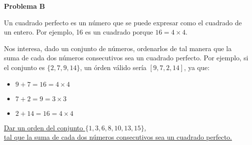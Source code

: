 \begin{center}
\Large \textbf{Problema B} \\
\end{center}

Un cuadrado perfecto es un número que se puede expresar como el cuadrado de un entero. Por ejemplo, 16 es un cuadrado porque $16 = 4 \times 4$.

\bigskip
Nos interesa, dado un conjunto de números, ordenarlos de tal manera que la suma de cada dos números consecutivos sea un cuadrado perfecto.
Por ejemplo, si el conjunto es $\{2, 7, 9, 14\}$, un órden válido sería $[9, 7, 2, 14]$, ya que:
\begin{itemize}
    \item $9 + 7 = 16 = 4 \times 4$
    \item $7 + 2 = 9 = 3 \times 3$
    \item $2 + 14 = 16 = 4 \times 4$
\end{itemize}

\underline{Dar un orden del conjunto $\{1, 3, 6, 8, 10, 13, 15\}$,} \\
\underline{tal que la suma de cada dos números consecutivos sea un cuadrado perfecto.}

